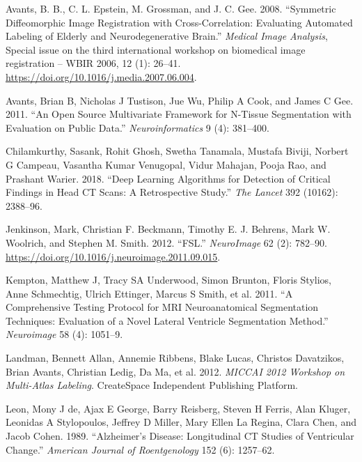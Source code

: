 \documentclass[]{elsarticle} %
\newlength{\cslhangindent}
\newenvironment{cslreferences}%
  {\setlength{\parindent}{0pt}%
  \everypar{\setlength{\hangindent}{\cslhangindent}}\ignorespaces}%
  {\par}
\begin{document}
\hypertarget{refs}{}
\begin{cslreferences}
\leavevmode\hypertarget{ref-avants_symmetric_2008}{}%
Avants, B. B., C. L. Epstein, M. Grossman, and J. C. Gee. 2008. ``Symmetric Diffeomorphic Image Registration with Cross-Correlation: Evaluating Automated Labeling of Elderly and Neurodegenerative Brain.'' \emph{Medical Image Analysis}, Special issue on the third international workshop on biomedical image registration -- WBIR 2006, 12 (1): 26--41. \url{https://doi.org/10.1016/j.media.2007.06.004}.

\leavevmode\hypertarget{ref-atropos}{}%
Avants, Brian B, Nicholas J Tustison, Jue Wu, Philip A Cook, and James C Gee. 2011. ``An Open Source Multivariate Framework for N-Tissue Segmentation with Evaluation on Public Data.'' \emph{Neuroinformatics} 9 (4): 381--400.

\leavevmode\hypertarget{ref-cq500}{}%
Chilamkurthy, Sasank, Rohit Ghosh, Swetha Tanamala, Mustafa Biviji, Norbert G Campeau, Vasantha Kumar Venugopal, Vidur Mahajan, Pooja Rao, and Prashant Warier. 2018. ``Deep Learning Algorithms for Detection of Critical Findings in Head CT Scans: A Retrospective Study.'' \emph{The Lancet} 392 (10162): 2388--96.

\leavevmode\hypertarget{ref-jenkinson_fsl_2012}{}%
Jenkinson, Mark, Christian F. Beckmann, Timothy E. J. Behrens, Mark W. Woolrich, and Stephen M. Smith. 2012. ``FSL.'' \emph{NeuroImage} 62 (2): 782--90. \url{https://doi.org/10.1016/j.neuroimage.2011.09.015}.

\leavevmode\hypertarget{ref-alvin}{}%
Kempton, Matthew J, Tracy SA Underwood, Simon Brunton, Floris Stylios, Anne Schmechtig, Ulrich Ettinger, Marcus S Smith, et al. 2011. ``A Comprehensive Testing Protocol for MRI Neuroanatomical Segmentation Techniques: Evaluation of a Novel Lateral Ventricle Segmentation Method.'' \emph{Neuroimage} 58 (4): 1051--9.

\leavevmode\hypertarget{ref-bennett2012miccai}{}%
Landman, Bennett Allan, Annemie Ribbens, Blake Lucas, Christos Davatzikos, Brian Avants, Christian Ledig, Da Ma, et al. 2012. \emph{MICCAI 2012 Workshop on Multi-Atlas Labeling}. CreateSpace Independent Publishing Platform.

\leavevmode\hypertarget{ref-de1989alzheimer}{}%
Leon, Mony J de, Ajax E George, Barry Reisberg, Steven H Ferris, Alan Kluger, Leonidas A Stylopoulos, Jeffrey D Miller, Mary Ellen La Regina, Clara Chen, and Jacob Cohen. 1989. ``Alzheimer's Disease: Longitudinal CT Studies of Ventricular Change.'' \emph{American Journal of Roentgenology} 152 (6): 1257--62.


\end{cslreferences}
\end{document}
